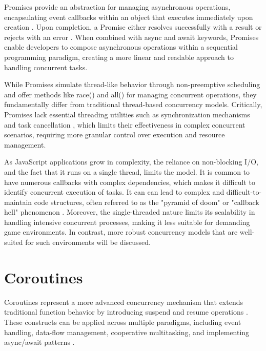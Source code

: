 \documentclass[]{final}
\begin{document}
Promises provide an abstraction for managing asynchronous operations,
encapsulating event callbacks within an object that executes
immediately upon creation \cite{zhao_concurrency_2021}.
Upon completion, a Promise either
resolves successfully with a result or rejects with an error
\cite{zhao_concurrency_2021}. When combined with async and await
keywords, Promises enable
developers to compose asynchronous operations within a
sequential programming paradigm, creating a more linear and
readable approach to handling concurrent tasks.

While Promises simulate thread-like behavior through non-preemptive scheduling
and offer methods like race() and all() for managing concurrent operations,
\cite{noauthor_event_2024} they fundamentally differ from traditional thread-based
concurrency models.
Critically, Promises lack essential threading utilities such as synchronization
mechanisms and task cancellation \cite{zhao_concurrency_2021}, which limits their effectiveness in
complex concurrent scenarios, requiring more granular control over execution
and resource management.

As JavaScript applications grow in complexity, the reliance on non-blocking
I/O, and the fact that it runs on a single thread,
limits the model. It
is common to have numerous callbacks with complex dependencies,
which makes it difficult to identify concurrent
execution of tasks.
It can can lead to complex and difficult-to-maintain code structures, often
referred to as the "pyramid of doom" or "callback hell" phenomenon \cite{belson_survey_2019, noauthor_callback_nodate}.
Moreover, the single-threaded nature limits its scalability in handling
intensive concurrent processes, making it less suitable for demanding game environments.
In contrast, more robust concurrency models that are well-suited for
such environments will be discussed.

\section{Coroutines}

\label{coroutines}

Coroutines represent a more advanced concurrency mechanism that extends
traditional function behavior by introducing suspend and resume operations \cite{belson_survey_2019}.
These  constructs can be applied across multiple paradigms, including event
handling, data-flow management, cooperative multitasking, and
implementing async/await patterns \cite{belson_survey_2019}.
\end{document}
